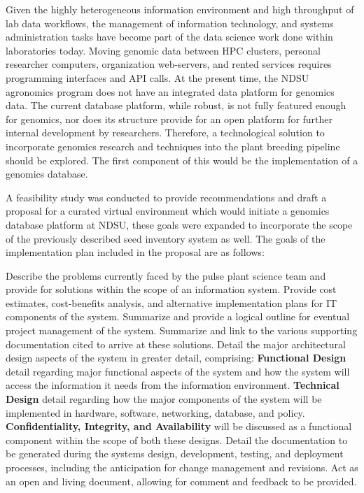 \documentclass[12pt, letterpaper,oneocolumn]{article}
\begin{document}
	Given the highly heterogeneous information environment and high throughput of lab data workflows, the management of information technology, and systems administration tasks have become part of the data science work done within laboratories today. Moving genomic data between HPC clusters, personal researcher computers, organization web-servers, and rented services requires programming interfaces and API calls. At the present time, the NDSU agronomics program does not have an integrated data platform for genomics data. The current database platform, while robust, is not fully featured enough for genomics, nor does its structure provide for an open platform for further internal development by researchers. Therefore, a technological solution to incorporate genomics research and techniques into the plant breeding pipeline should be explored. The first component of this would be the implementation of a genomics database.

	A feasibility study was conducted to provide recommendations and draft a proposal for a curated virtual environment which would initiate a genomics database platform at NDSU, these goals were expanded to incorporate the scope of the previously described seed inventory system as well. The goals of the implementation plan included in the proposal are as follows:

	\begin{outline}
		\1 Describe the problems currently faced by the pulse plant science team and provide for solutions within the scope of an information system.
		\1 Provide cost estimates, cost-benefits analysis, and alternative implementation plans for IT components of the system.
		\1 Summarize and provide a logical outline for eventual project management of the system.
		\1 Summarize and link to the various supporting documentation cited to arrive at these solutions.
		\1 Detail the major architectural design aspects of the system in greater detail, comprising:
		\2 \textbf{Functional Design} detail regarding major functional aspects of the system and how the system will access the information it needs from the information environment.
		\2 \textbf{Technical Design} detail regarding how the major components of the system will be implemented in hardware, software, networking, database, and policy.
		\2 \textbf{Confidentiality, Integrity, and Availability} will be discussed as a functional component within the scope of both these designs.
		\1 Detail the documentation to be generated during the systems design, development, testing, and deployment processes, including the anticipation for change management and revisions.
		\1 Act as an open and living document, allowing for comment and feedback to be provided.
	\end{outline}
\end{document}
